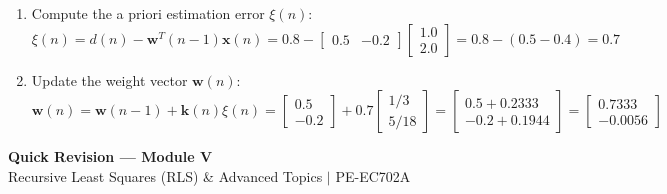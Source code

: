 \documentclass[12pt,a4paper]{article}
\begin{document}
\begin{tcolorbox}[examplebox, title={Example: RLS Iteration Computation}]
\begin{enumerate}[label=\textbf{\arabic*.}, leftmargin=*, itemsep=4pt]
\[    \]
  \item Compute the a priori estimation error $\xi(n)$:
    \[
      \xi(n) = d(n) - \mathbf{w}^T(n-1)\mathbf{x}(n) = 0.8 - \begin{bmatrix} 0.5 & -0.2 \end{bmatrix} \begin{bmatrix} 1.0 \\ 2.0 \end{bmatrix} = 0.8 - (0.5 - 0.4) = 0.7
    \]
  \item Update the weight vector $\mathbf{w}(n)$:
    \[
      \mathbf{w}(n) = \mathbf{w}(n-1) + \mathbf{k}(n)\xi(n) = \begin{bmatrix} 0.5 \\ -0.2 \end{bmatrix} + 0.7 \begin{bmatrix} 1/3 \\ 5/18 \end{bmatrix} = \begin{bmatrix} 0.5 + 0.2333 \\ -0.2 + 0.1944 \end{bmatrix} = \begin{bmatrix} 0.7333 \\ -0.0056 \end{bmatrix}
    \]
\end{enumerate}
\end{tcolorbox}

\newpage
\begin{center}
  {\large\bfseries\color{myred} Quick Revision --- Module V}\\[3pt]
  {\small\color{mydark} Recursive Least Squares (RLS) \& Advanced Topics $|$ PE-EC702A}
\end{center}
\noindent{\color{myred}\rule{\linewidth}{1.2pt}}
\vspace{4pt}
\end{document}
